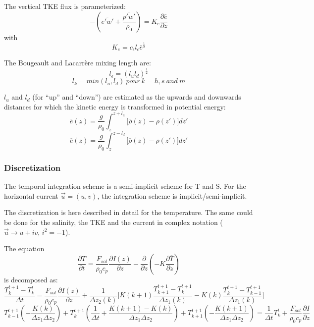 The vertical TKE flux is parameterized:
\begin{equation}
-\left(\overline{e'w'}+\frac{\overline{p'w'}}{\rho_{0}}\right)=K_{e}\frac{\partial \overline{e}}{\partial z}
\end{equation}
with
\begin{equation}
K_e=c_{\epsilon}l_{\epsilon}\overline{e}^{\frac{1}{2}}
\end{equation}

The Bougeault and Lacarr\`ere %
 mixing length are:
\begin{equation}
l_{\epsilon}=(l_{u}l_{d})^{\frac{1}{2}}
\end{equation}
\begin{equation}
l_{k}=min(l_{u},l_{d})~ pour~k=h,s~and~m
\end{equation}

$l_{u}$ and $l_{d}$ (for ``up'' and ``down'') are estimated as the upwards and downwards distances for which the kinetic energy is transformed in potential energy:
\begin{equation}
\overline{e}(z)=\frac{g}{\rho_{0}}\int_{z}^{z+l_{u}}\lbrack\overline{\rho}(z)-\rho(z')\rbrack dz'
\end{equation} 
\begin{equation}
\overline{e}(z)=\frac{g}{\rho_{0}}\int_{z}^{z-l_{d}}\lbrack\overline{\rho}(z)-\rho(z')\rbrack dz'
\end{equation} 

\subsubsection{Discretization}
The temporal integration scheme is a semi-implicit scheme for T and S. For the horizontal current $\vec{u}=(u,v)$, the integration scheme is implicit/semi-implicit. 

The discretization is here described in detail for the temperature. The same could be done for the salinity, the TKE and the current in complex notation ($\vec{u}\rightarrow u+iv$, $i^{2}=-1$). 

The equation
$$
\frac{\partial T}{\partial t}=\frac{F_{sol}}{\rho_{0}c_{p}}\frac{\partial I(z)}{\partial z}-\frac{\partial}{\partial z}\left(-K\frac{\partial \overline{T}}{\partial z}\right)$$
is decomposed as:
\begin{equation}
\frac{T^{t+1}_{k}-T^{t}_{k}}{\Delta t}=\frac{F_{sol}}{\rho_{0}c_{p}}\frac{\partial I(z)}{\partial z}+\frac{1}{\Delta z_{2}(k)}\lbrack K(k+1)\frac{T^{t+1}_{k+1}-T^{t+1}_{k}}{\Delta z_{1}(k)}-K(k)\frac{T^{t+1}_{k}-T^{t+1}_{k-1}}{\Delta z_{1}(k)}\rbrack
\end{equation}
$$T^{t+1}_{k-1}\left(-\frac{K(k)}{\Delta z_{1}\Delta z_{2}}\right)+T^{t+1}_{k}\left(\frac{1}{\Delta t}+\frac{K(k+1)-K(k)}{\Delta z_{1}\Delta z_{2}}\right)+T^{t+1}_{k+1}\left(-\frac{K(k+1)}{\Delta z_{1}\Delta z_{2}}\right)=\frac{1}{\Delta t}T^{t}_{k}+\frac{F_{sol}}{\rho_{0}c_{p}}\frac{\partial I}{\partial z}$$

